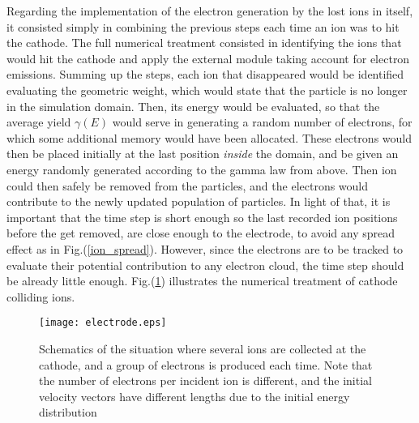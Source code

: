 Regarding the implementation of the electron generation by the lost ions in itself, it consisted simply in combining the previous steps each time an ion was to hit the cathode. The full numerical treatment consisted in identifying the ions that would hit the cathode and apply the external module taking account for electron emissions. Summing up the steps, each ion that disappeared would be identified evaluating the geometric weight, which would state that the particle is no longer in the simulation domain. Then, its energy would be evaluated, so that the average yield $\gamma(E)$ would serve in generating a random number of electrons, for which some additional memory would have been allocated. These electrons would then be placed initially at the last position \emph{inside} the domain, and be given an energy randomly generated according to the gamma law from above. Then ion could then safely be removed from the particles, and the electrons would contribute to the newly updated population of particles. In light of that, it is important that the time step is short enough so the last recorded ion positions before the get removed, are close enough to the electrode, to avoid any spread effect as in Fig.(\ref{ion_spread}). However, since the electrons are to be tracked to evaluate their potential contribution to any electron cloud, the time step should be already little enough. Fig.(\ref{scheme}) illustrates the numerical treatment of cathode colliding ions. 

\begin{figure}[h!]
\centering
	\texttt{[image: electrode.eps]}
	\caption{\label{scheme} Schematics of the situation where several ions are collected at the cathode, and a group of electrons is produced each time. Note that the number of electrons per incident ion is different, and the initial velocity vectors have different lengths due to the initial energy distribution}
\end{figure}  




